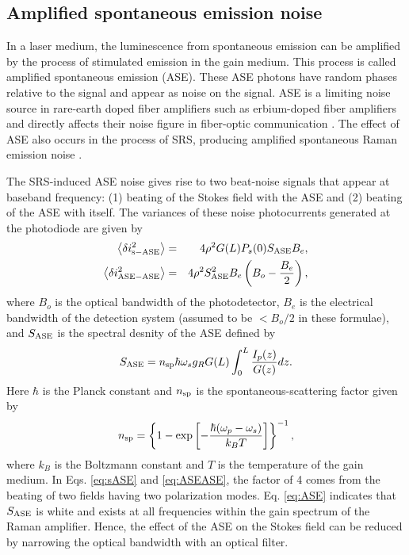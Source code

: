 \documentclass[10pt,letterpaper]{article}
\begin{document}
\subsection{Amplified spontaneous emission noise}
In a laser medium, the luminescence from spontaneous emission can be amplified by the process of stimulated emission in the gain medium. This process is called amplified spontaneous emission (ASE). These ASE photons have random phases relative to the signal and appear as noise on the signal. ASE is a limiting noise source in rare-earth doped fiber amplifiers such as erbium-doped fiber amplifiers and directly affects their noise figure in fiber-optic communication \cite{agrawal2001academic}. The effect of ASE also occurs in the process of SRS, producing amplified spontaneous Raman emission noise \cite{mochizuki1986jlightwavetechnol,smith1972appliedoptics}. 

The SRS-induced ASE noise gives rise to two beat-noise signals that appear at baseband frequency: (1) beating of the Stokes field with the ASE and (2) beating of the ASE with itself. The variances of these noise photocurrents generated at the photodiode are given by \cite{headley2005elsevieracademicpress}
\begin{eqnarray}
\label{eq:sASE}
\left\langle \delta i_{\rm s-ASE}^2\right\rangle &=& 4 \rho^2 G(L) P_s(0) S_{\rm ASE} B_e, \\
\label{eq:ASEASE}
\left\langle \delta i_{\rm ASE-ASE}^2\right\rangle &=& 4 \rho^2 S_{\rm ASE}^2 B_e \left(B_o-\frac{B_e}{2}\right),
\end{eqnarray}
where $B_o$ is the optical bandwidth of the photodetector, $B_e$ is the electrical bandwidth of the detection system (assumed to be $<B_o/2$ in these formulae), and $S_{\rm ASE}$ is the spectral desnity of the ASE defined by \cite{kogelnik1964proceedieee}
\begin{equation}
S_{\rm ASE} = n_{\rm sp} \hbar \omega_s g_R G(L) \int_0^L {\frac{I_p(z)}{G(z)} dz}.
\label{eq:ASE}
\end{equation}
Here $\hbar$ is the Planck constant and $n_{\rm sp}$ is the spontaneous-scattering factor given by
\begin{equation}
n_{\rm sp}=\left\{1-\exp\left[-\frac{\hbar (\omega_p-\omega_s)}{k_B T}\right]\right\}^{-1},
\end{equation}
where $k_B$ is the Boltzmann constant and $T$ is the temperature of the gain medium. In Eqs. \ref{eq:sASE} and \ref{eq:ASEASE}, the factor of 4 comes from the beating of two fields having two polarization modes. Eq. \ref{eq:ASE} indicates that $S_{\rm ASE}$ is white and exists at all frequencies within the gain spectrum of the Raman amplifier. Hence, the effect of the ASE on the Stokes field can be reduced by narrowing the optical bandwidth with an optical filter. 
\end{document}
